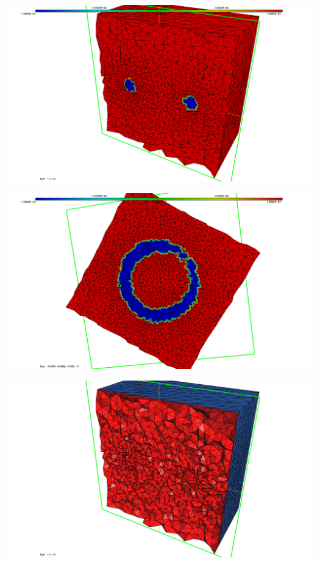 \begingroup
	\begin{minipage}[t]{.5\linewidth}
		\centering
		\includegraphics[clip=true, trim=5cm 0 2cm 0, scale=.2]{Bordeaux/figures/3D/torusDomLS1.png}
	\end{minipage}
	\hfill
	\begin{minipage}[t]{.5\linewidth}
		\centering
		\includegraphics[clip=true, trim=5cm 0 2cm 0, scale=.2]{Bordeaux/figures/3D/torusDomLS2.png}
	\end{minipage}
	\begin{minipage}[t]{.5\linewidth}
		\centering
		\includegraphics[clip=true, trim=5cm 0 2cm 0, scale=.2]{Bordeaux/figures/3D/torusAdapt2.png}
	\end{minipage}
